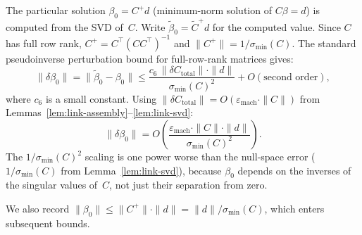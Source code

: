 \begin{lemma}\label{lem:link-beta0}
The particular solution $\beta_0 = C^+ d$ (minimum-norm solution
of $C\beta = d$) is computed from the SVD of~$C$.
Write $\tilde\beta_0 = \tilde C^+ d$ for the computed value.
Since $C$ has full row rank, $C^+ = C^\top(C C^\top)^{-1}$
and $\|C^+\| = 1/\sigma_{\min}(C)$.
The standard pseudoinverse perturbation bound
for full-row-rank matrices gives:
\[
  \|\delta\beta_0\|
  = \|\tilde\beta_0 - \beta_0\|
  \leq \frac{c_6\,\|\delta C_{\mathrm{total}}\| \cdot \|d\|}
       {\sigma_{\min}(C)^2}
  + O(\text{second order}),
\]
where $c_6$ is a small constant.
Using $\|\delta C_{\mathrm{total}}\| = O(\varepsilon_{\mathrm{mach}} \cdot \|C\|)$
from Lemmas~\ref{lem:link-assembly}--\ref{lem:link-svd}:
\begin{equation}\label{eq:beta0-perturbation}
  \|\delta\beta_0\|
  = O\!\left(
    \frac{\varepsilon_{\mathrm{mach}} \cdot \|C\| \cdot \|d\|}
         {\sigma_{\min}(C)^2}
  \right).
\end{equation}
The $1/\sigma_{\min}(C)^2$ scaling is one power worse than the
null-space error ($1/\sigma_{\min}(C)$ from Lemma~\ref{lem:link-svd}),
because $\beta_0$ depends on the inverses of the singular values of~$C$,
not just their separation from zero.

We also record $\|\beta_0\| \leq \|C^+\| \cdot \|d\|
= \|d\| / \sigma_{\min}(C)$, which enters subsequent bounds.
\end{lemma}


